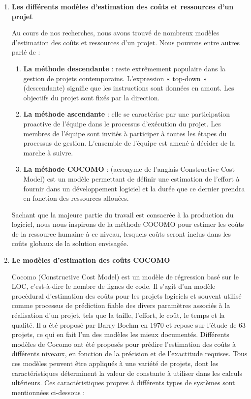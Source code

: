 \begin{enumerate}
	\item \textbf{Les différents modèles d'estimation des coûts et ressources d’un projet}

	      Au cours de nos recherches, nous avons trouvé de nombreux modèles d’estimation des coûts et ressources d’un projet. Nous pouvons entre autres parlé de :

	      \begin{enumerate}
		      \item \textbf{La méthode descendante} : reste extrêmement populaire dans la gestion de projets contemporains. L'expression « top-down » (descendante) signifie que les instructions sont données en amont. Les objectifs du projet sont fixés par la direction.
		      \item \textbf{La méthode ascendante} : elle se caractérise par une participation proactive de l'équipe dans le processus d'exécution du projet. Les membres de l'équipe sont invités à participer à toutes les étapes du processus de gestion. L'ensemble de l'équipe est amené à décider de la marche à suivre.
		      \item \textbf{La méthode COCOMO} : (acronyme de l'anglais Constructive Cost Model) est un modèle permettant de définir une estimation de l'effort à fournir dans un développement logiciel et la durée que ce dernier prendra en fonction des ressources allouées.
	      \end{enumerate}

	      Sachant que la majeure partie du travail est consacrée à la production du logiciel, nous nous inspirons de la méthode COCOMO pour estimer les coûts de la ressource humaine à ce niveau, lesquels coûts seront inclus dans les coûts globaux de la solution envisagée.

	\item \textbf{Le modèles d'estimation des coûts COCOMO}

	      Cocomo (Constructive Cost Model) est un modèle de régression basé sur le LOC, c’est-à-dire le nombre de lignes de code. Il s’agit d’un modèle procédural d’estimation des coûts pour les projets logiciels et souvent utilisé comme processus de prédiction fiable des divers paramètres associés à la réalisation d’un projet, tels que la taille, l’effort, le coût, le temps et la qualité. Il a été proposé par Barry Boehm en 1970 et repose sur l’étude de 63 projets, ce qui en fait l’un des modèles les mieux documentés. Différents modèles de Cocomo ont été proposés pour prédire l’estimation des coûts à différents niveaux, en fonction de la précision et de l’exactitude requises. Tous ces modèles peuvent être appliqués à une variété de projets, dont les caractéristiques déterminent la valeur de constante à utiliser dans les calculs ultérieurs. Ces caractéristiques propres à différents types de systèmes sont mentionnées ci-dessous :


\end{enumerate}
